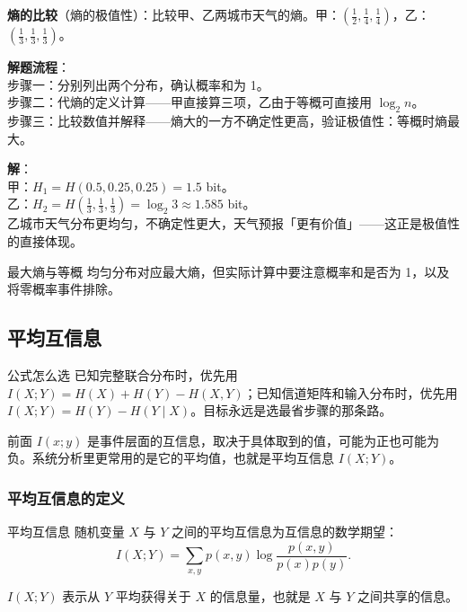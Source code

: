 \begin{example}
\label{ex:ch2-entropy-comparison}
\textbf{熵的比较}（熵的极值性）：比较甲、乙两城市天气的熵。甲：$(\frac{1}{2},\frac{1}{4},\frac{1}{4})$，乙：$(\frac{1}{3},\frac{1}{3},\frac{1}{3})$。

\noindent \textbf{解题流程}：\\[2pt]
步骤一：分别列出两个分布，确认概率和为 1。\\
步骤二：代熵的定义计算——甲直接算三项，乙由于等概可直接用 $\log_2 n$。\\
步骤三：比较数值并解释——熵大的一方不确定性更高，验证极值性：等概时熵最大。

\textbf{解}：\\[2pt]
甲：$H_1 = H(0.5,0.25,0.25)=1.5$ bit。\\
乙：$H_2 = H(\frac{1}{3},\frac{1}{3},\frac{1}{3})=\log_2 3\approx 1.585$ bit。\\[2pt]
乙城市天气分布更均匀，不确定性更大，天气预报「更有价值」——这正是极值性的直接体现。
\end{example}

\begin{warningBox}{最大熵与等概}
均匀分布对应最大熵，但实际计算中要注意概率和是否为 1，以及将零概率事件排除。
\end{warningBox}

\subsection{平均互信息}

\begin{remarkBox}{公式怎么选}
已知完整联合分布时，优先用 $I(X;Y)=H(X)+H(Y)-H(X,Y)$；已知信道矩阵和输入分布时，优先用 $I(X;Y)=H(Y)-H(Y\mid X)$。目标永远是选最省步骤的那条路。
\end{remarkBox}

前面 $I(x;y)$ 是事件层面的互信息，取决于具体取到的值，可能为正也可能为负。系统分析里更常用的是它的平均值，也就是平均互信息 $I(X;Y)$。

\subsubsection{平均互信息的定义}
\begin{definitionBox}{平均互信息}
随机变量 $X$ 与 $Y$ 之间的平均互信息为互信息的数学期望：
\[
I(X;Y) = \sum_{x,y} p(x,y) \log \frac{p(x,y)}{p(x)p(y)}.
\]
\end{definitionBox}

$I(X;Y)$ 表示从 $Y$ 平均获得关于 $X$ 的信息量，也就是 $X$ 与 $Y$ 之间共享的信息。

